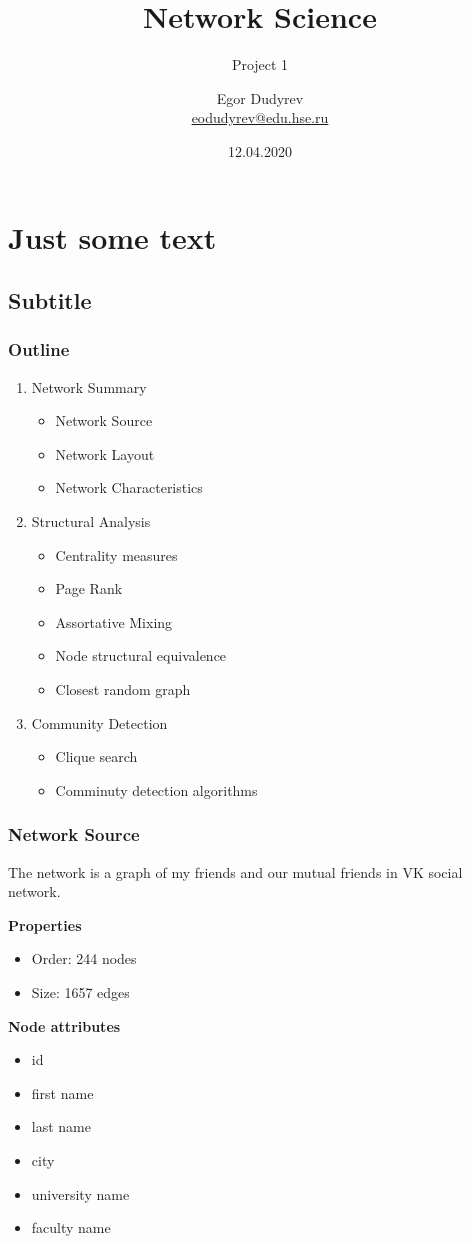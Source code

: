 \documentclass{beamer}
\title[Short title]{Network Science}
\subtitle{Project 1}
\author[Egor Dudyrev]{Egor Dudyrev \\ \smallskip \scriptsize \url{eodudyrev@edu.hse.ru}}
\institute[Higher School of Economics]{National Research University \\ Higher School of Economics (Moscow)}
\date{12.04.2020}
\begin{document}

\frame[plain]{\titlepage}	%

\section{Just some text}
\subsection{Subtitle}

\begin{frame}
\frametitle{Outline}
\begin{enumerate}
\item Network Summary
\begin{itemize}
\item Network Source
\item Network Layout
\item Network Characteristics
\end{itemize}
\item Structural Analysis
\begin{itemize}
\item Centrality measures
\item Page Rank
\item Assortative Mixing
\item Node structural equivalence
\item Closest random graph
\end{itemize}
\item Community Detection
\begin{itemize}
\item Clique search
\item Comminuty detection algorithms
\end{itemize}
\end{enumerate}

\end{frame}

\begin{frame}
\frametitle{Network Source}
The network is a graph of my friends and our mutual friends in VK social network.\\
\begin{multicols}{2}
\textbf{Properties}\\
\begin{itemize}
\item Order: 244 nodes
\item Size: 1657 edges
\end{itemize}
\columnbreak
\textbf{Node attributes}\\
\begin{itemize}
\item id
\item first name
\item last name
\item city
\item university name
\item faculty name
\end{itemize}
\end{multicols}
\end{frame}
\end{document}
